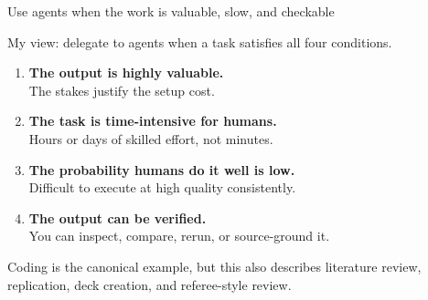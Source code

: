 \documentclass[aspectratio=169,11pt]{beamer}
\begin{document}
\begin{frame}{Use agents when the work is valuable, slow, and checkable}

My view: delegate to agents when a task satisfies all four conditions.

\vspace{0.25cm}

\begin{enumerate}\setlength\itemsep{0.25em}
    \item \textbf{The output is highly valuable.} \\
    {\small\color{warmgray} The stakes justify the setup cost.}

    \item \textbf{The task is time-intensive for humans.} \\
    {\small\color{warmgray} Hours or days of skilled effort, not minutes.}

    \item \textbf{The probability humans do it well is low.} \\
    {\small\color{warmgray} Difficult to execute at high quality consistently.}

    \item \textbf{The output can be verified.} \\
    {\small\color{warmgray} You can inspect, compare, rerun, or source-ground it.}
\end{enumerate}

\vspace{0.25cm}
\alert{Coding is the canonical example, but this also describes literature review, replication, deck creation, and referee-style review.}

\end{frame}
\end{document}
